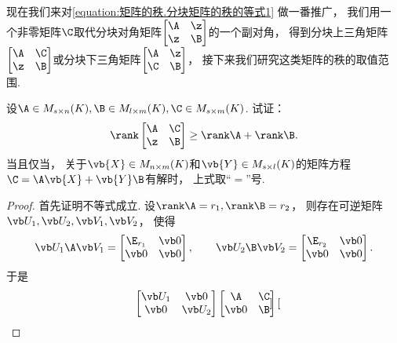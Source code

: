 现在我们来对\cref{equation:矩阵的秩.分块矩阵的秩的等式1} 做一番推广，
我们用一个非零矩阵\(\C\)取代分块对角矩阵\(\begin{bmatrix}
	\A & \z \\
	\z & \B
\end{bmatrix}\)的一个副对角，
得到分块上三角矩阵\(\begin{bmatrix}
	\A & \C \\
	\z & \B
\end{bmatrix}\)或分块下三角矩阵\(\begin{bmatrix}
	\A & \z \\
	\C & \B
\end{bmatrix}\)，
接下来我们研究这类矩阵的秩的取值范围.
\begin{example}
设\(\A \in M_{s \times n}(K),
\B \in M_{l \times m}(K),
\C \in M_{s \times m}(K)\).
试证：\begin{equation}
	\rank\begin{bmatrix}
		\A & \C \\
		\z & \B
	\end{bmatrix} \geq \rank\A + \rank\B.
	\label{equation:矩阵的秩.分块矩阵的秩的不等式}
\end{equation}
当且仅当，
关于\(\vb{X} \in M_{n \times m}(K)\)和\(\vb{Y} \in M_{s \times l}(K)\)的矩阵方程
\(\C=\A\vb{X}+\vb{Y}\B\)有解时，
上式取“\(=\)”号.
\begin{proof}
首先证明不等式成立.
设\(\rank\A=r_1,
\rank\B=r_2\)，
则存在可逆矩阵\(\P_1,\P_2,\Q_1,\Q_2\)，
使得\[
	\P_1\A\Q_1 = \begin{bmatrix}
		\E_{r_1} & \vb0 \\
		\vb0 & \vb0
	\end{bmatrix},
	\qquad
	\P_2\B\Q_2 = \begin{bmatrix}
		\E_{r_2} & \vb0 \\
		\vb0 & \vb0
	\end{bmatrix}.
\]
于是\[
	\begin{bmatrix}
		\P_1 & \vb0 \\
		\vb0 & \P_2
	\end{bmatrix}
	\begin{bmatrix}
		\A & \C \\
		\vb0 & \B
	\end{bmatrix}
	\begin{bmatrix}

\end{bmatrix}\]
\end{proof}
\end{example}
